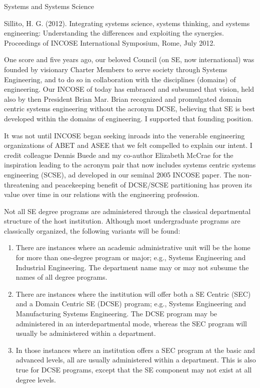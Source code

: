 Systems and Systems Science

Sillito, H. G. (2012). Integrating systems science, systems thinking, and systems engineering: Understanding the differences and exploiting the synergies. Proceedings of INCOSE International Symposium, Rome, July 2012.

One score and five years ago, our beloved Council (on SE, now international) was founded by visionary Charter Members to serve society through Systems Engineering, and to do so in collaboration with the disciplines (domains) of engineering. Our INCOSE of today has embraced and subsumed that vision, held also by then President Brian Mar. Brian recognized and promulgated domain centric systems engineering without the acronym DCSE, believing that SE is best developed within the domains of engineering. I supported that founding position.

It was not until INCOSE began seeking inroads into the venerable engineering organizations of ABET and ASEE that we felt compelled to explain our intent. I credit colleague Dennis Buede and my co-author Elizabeth McCrae for the inspiration leading to the acronym pair that now includes systems centric systems engineering (SCSE), ad developed in our seminal 2005 INCOSE paper. The non-threatening and peacekeeping benefit of DCSE/SCSE partitioning has proven its value over time in our relations with the engineering profession.

Not all SE degree programs are administered through the classical departmental structure of the host institution. Although most undergraduate programs are classically organized, the following variants will be found:

\begin{enumerate}
\item There are instances where an academic administrative unit will be the home for more than one-degree program or major; e.g., Systems Engineering and Industrial Engineering. The department name may or may not subsume the names of all degree programs.
\item There are instances where the institution will offer both a SE Centric (SEC) and a Domain Centric SE (DCSE) program; e.g., Systems Engineering and Manufacturing Systems Engineering. The DCSE program may be administered in an interdepartmental mode, whereas the SEC program will usually be administered within a department.
\item In those instances where an institution offers a SEC program at the basic and advanced levels, all are usually administered within a department. This is also true for DCSE programs, except that the SE component may not exist at all degree levels.
\end{enumerate}


